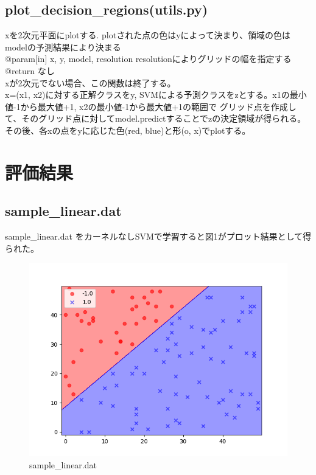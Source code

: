 \documentclass{jsarticle}
\begin{document}
\subsection*{plot\_decision\_regions(utils.py)}
xを2次元平面にplotする.
plotされた点の色はyによって決まり、領域の色はmodelの予測結果により決まる \\
@param[in] x, y, model, resolution resolutionによりグリッドの幅を指定する \\
@return なし \\
xが2次元でない場合、この関数は終了する。\\
x=(x1, x2)に対する正解クラスをy, SVMによる予測クラスをzとする。x1の最小値-1から最大値+1, x2の最小値-1から最大値+1の範囲で
グリッド点を作成して、そのグリッド点に対してmodel.predictすることでzの決定領域が得られる。\\
その後、各xの点をyに応じた色(red, blue)と形(o, x)でplotする。

\section{評価結果}
\subsection{sample\_linear.dat}
sample\_linear.dat をカーネルなしSVMで学習すると図1がプロット結果として得られた。
\begin{figure}[!h]
\centering \includegraphics[width=15cm]{sample_linear.png}
\caption{sample\_linear.dat}
\end{figure}
\end{document}
